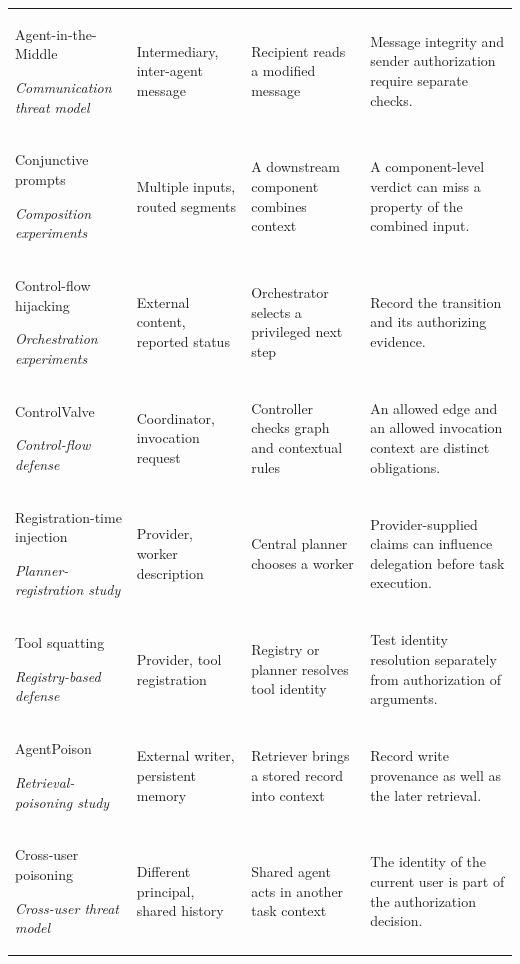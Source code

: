 \documentclass[11pt]{article}
\begin{document}
\begin{longtable}{@{}p{.19\linewidth}@{\hspace{.02\linewidth}}p{.22\linewidth}@{\hspace{.02\linewidth}}p{.24\linewidth}@{\hspace{.02\linewidth}}p{.28\linewidth}@{}}
Agent-in-the-Middle~\citep{he2025aitm}\par{\footnotesize\itshape Communication threat model} & Intermediary, inter-agent message & Recipient reads a modified message & Message integrity and sender authorization require separate checks.\\[3pt]
Conjunctive prompts~\citep{arif2026conjunctive}\par{\footnotesize\itshape Composition experiments} & Multiple inputs, routed segments & A downstream component combines context & A component-level verdict can miss a property of the combined input.\\[3pt]
Control-flow hijacking~\citep{triedman2025mas}\par{\footnotesize\itshape Orchestration experiments} & External content, reported status & Orchestrator selects a privileged next step & Record the transition and its authorizing evidence.\\[3pt]
ControlValve~\citep{jha2025controlvalve}\par{\footnotesize\itshape Control-flow defense} & Coordinator, invocation request & Controller checks graph and contextual rules & An allowed edge and an allowed invocation context are distinct obligations.\\[3pt]
Registration-time injection~\citep{Yu2026MisleadingTPO}\par{\footnotesize\itshape Planner-registration study} & Provider, worker description & Central planner chooses a worker & Provider-supplied claims can influence delegation before task execution.\\[3pt]
Tool squatting~\citep{Narajala2025SecuringGMAU}\par{\footnotesize\itshape Registry-based defense} & Provider, tool registration & Registry or planner resolves tool identity & Test identity resolution separately from authorization of arguments.\\[3pt]
AgentPoison~\citep{Chen2024AgentPoisonRLBS}\par{\footnotesize\itshape Retrieval-poisoning study} & External writer, persistent memory & Retriever brings a stored record into context & Record write provenance as well as the later retrieval.\\[3pt]
Cross-user poisoning~\citep{Patlan2025CrossUserPUAK}\par{\footnotesize\itshape Cross-user threat model} & Different principal, shared history & Shared agent acts in another task context & The identity of the current user is part of the authorization decision.\\[3pt]

\end{longtable}
\end{document}

